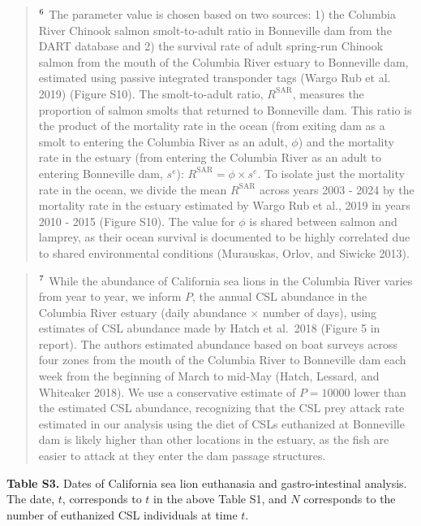 \documentclass[
]{article}
\begin{document}
\begin{quote}
\(\textsuperscript{6}\) The parameter value is chosen based on two
sources: 1) the Columbia River Chinook salmon smolt-to-adult ratio in
Bonneville dam from the DART database and 2) the survival rate of adult
spring-run Chinook salmon from the mouth of the Columbia River estuary
to Bonneville dam, estimated using passive integrated transponder tags
(Wargo Rub et al. 2019) (Figure S10). The smolt-to-adult ratio,
\(R^\text{SAR}\), measures the proportion of salmon smolts that returned
to Bonneville dam. This ratio is the product of the mortality rate in
the ocean (from exiting dam as a smolt to entering the Columbia River as
an adult, \(\phi\)) and the mortality rate in the estuary (from entering
the Columbia River as an adult to entering Bonneville dam, \(s^e\)):
\(R^\text{SAR} = \phi \times s^e\). To isolate just the mortality rate
in the ocean, we divide the mean \(R^\text{SAR}\) across years 2003 -
2024 by the mortality rate in the estuary estimated by Wargo Rub et al.,
2019 in years 2010 - 2015 (Figure S10). The value for \(\phi\) is shared
between salmon and lamprey, as their ocean survival is documented to be
highly correlated due to shared environmental conditions (Murauskas,
Orlov, and Siwicke 2013).
\end{quote}

\begin{quote}
\(\textsuperscript{7}\) While the abundance of California sea lions in
the Columbia River varies from year to year, we inform \(P\), the annual
CSL abundance in the Columbia River estuary (daily abundance \(\times\)
number of days), using estimates of CSL abundance made by Hatch et
al.~2018 (Figure 5 in report). The authors estimated abundance based on
boat surveys across four zones from the mouth of the Columbia River to
Bonneville dam each week from the beginning of March to mid-May (Hatch,
Lessard, and Whiteaker 2018). We use a conservative estimate of
\(P = 10000\) lower than the estimated CSL abundance, recognizing that
the CSL prey attack rate estimated in our analysis using the diet of
CSLs euthanized at Bonneville dam is likely higher than other locations
in the estuary, as the fish are easier to attack at they enter the dam
passage structures.
\end{quote}

\newpage

\textbf{Table S3.} Dates of California sea lion euthanasia and
gastro-intestinal analysis. The date, \(t\), corresponds to \(t\) in the
above Table S1, and \(N\) corresponds to the number of euthanized CSL
individuals at time \(t\).
\end{document}
